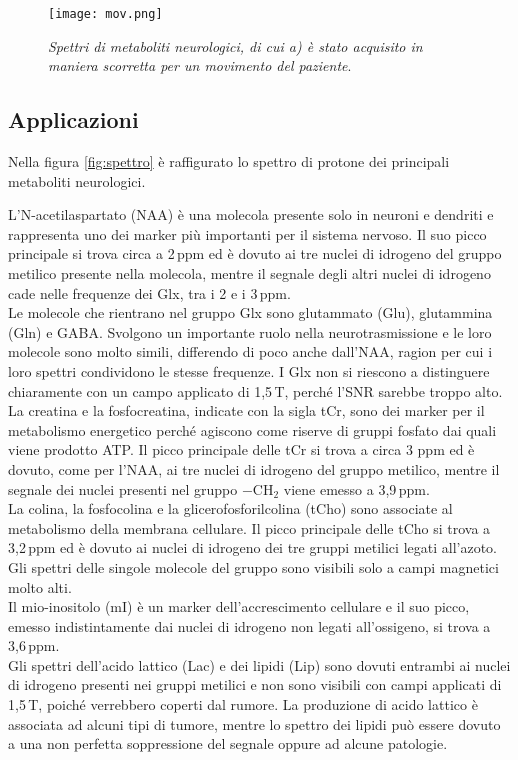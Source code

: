 \documentclass{report}
\newcommand{\figref}[1]{figura \ref{#1}}
\numberwithin{equation}{section}
\numberwithin{figure}{section}
\begin{document}
\begin{figure}[htp]
\centering
\texttt{[image: mov.png]}
\caption{\label{fig:mov} \textit{Spettri di metaboliti neurologici, di cui a) è stato acquisito in maniera scorretta per un movimento del paziente}.}
\end{figure}

\subsection{Applicazioni}
Nella \figref{fig:spettro} è raffigurato lo spettro di protone dei principali metaboliti neurologici.

L'N-acetilaspartato (NAA) è una molecola presente solo in neuroni e dendriti e rappresenta uno dei marker più importanti per il sistema nervoso. Il suo picco principale si trova circa a 2\,ppm ed è dovuto ai tre nuclei di idrogeno del gruppo metilico presente nella molecola, mentre il segnale degli altri nuclei di idrogeno cade nelle frequenze dei Glx, tra i 2 e i 3\,ppm.\\
Le molecole che rientrano nel gruppo Glx sono glutammato (Glu), glutammina (Gln) e GABA. Svolgono un importante ruolo nella neurotrasmissione e le loro molecole sono molto simili, differendo di poco anche dall'NAA, ragion per cui i loro spettri condividono le stesse frequenze. I Glx non si riescono a distinguere chiaramente con un campo applicato di 1,5\,T, perché l'SNR sarebbe troppo alto.\\
La creatina e la fosfocreatina, indicate con la sigla tCr, sono dei marker per il metabolismo energetico perché agiscono come riserve di gruppi fosfato dai quali viene prodotto ATP. Il picco principale delle tCr si trova a circa 3 ppm ed è dovuto, come per l'NAA, ai tre nuclei di idrogeno del gruppo metilico, mentre il segnale dei nuclei presenti nel gruppo $\mathrm{-CH_2}$ viene emesso a 3,9\,ppm.\\
La colina, la fosfocolina e la glicerofosforilcolina (tCho) sono associate al metabolismo della membrana cellulare. Il picco principale delle tCho si trova a 3,2\,ppm ed è dovuto ai nuclei di idrogeno dei tre gruppi metilici legati all'azoto. Gli spettri delle singole molecole del gruppo sono visibili solo a campi magnetici molto alti.\\
Il mio-inositolo (mI) è un marker dell'accrescimento cellulare e il suo picco, emesso indistintamente dai nuclei di idrogeno non legati all'ossigeno, si trova a 3,6\,ppm.\\
Gli spettri dell'acido lattico (Lac) e dei lipidi (Lip) sono dovuti entrambi ai nuclei di idrogeno presenti nei gruppi metilici e non sono visibili con campi applicati di 1,5\,T, poiché verrebbero coperti dal rumore. La produzione di acido lattico è associata ad alcuni tipi di tumore, mentre lo spettro dei lipidi può essere dovuto a una non perfetta soppressione del segnale oppure ad alcune patologie.
\end{document}
